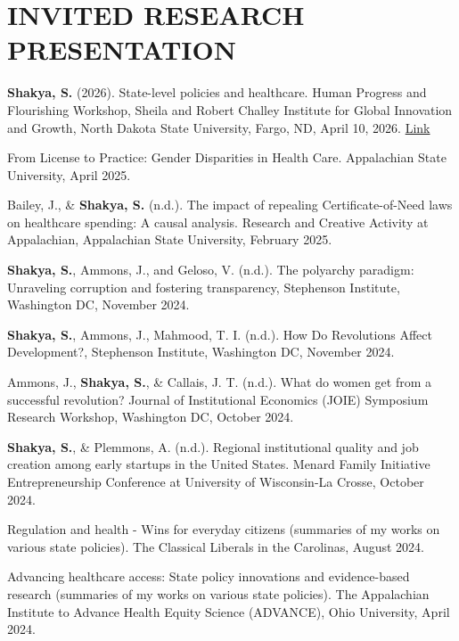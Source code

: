 \section*{INVITED RESEARCH PRESENTATION}
\begin{etaremune}
\item \textbf{Shakya, S.} (2026). State-level policies and healthcare. Human Progress and Flourishing Workshop, Sheila and Robert Challey Institute for Global Innovation and Growth, North Dakota State University, Fargo, ND, April 10, 2026. \hfill \href{https://www.ndsu.edu/challeyinstitute/events/workshop}{Link}

\item From License to Practice: Gender Disparities in Health Care. Appalachian State University, April 2025.

\item Bailey, J., \& \textbf{Shakya, S.} (n.d.). The impact of repealing Certificate-of-Need laws on healthcare spending: A causal analysis. Research and Creative Activity at Appalachian, Appalachian State University, February 2025.

\item \textbf{Shakya, S.}, Ammons, J., and Geloso, V. (n.d.). The polyarchy paradigm: Unraveling corruption and fostering transparency, Stephenson Institute, Washington DC, November 2024.

\item \textbf{Shakya, S.}, Ammons, J., Mahmood, T. I. (n.d.). How Do Revolutions Affect Development?, Stephenson Institute, Washington DC, November 2024.

\item Ammons, J., \textbf{Shakya, S.}, \& Callais, J. T. (n.d.). What do women get from a successful revolution? Journal of Institutional Economics (JOIE) Symposium Research Workshop, Washington DC, October 2024.

\item \textbf{Shakya, S.}, \& Plemmons, A. (n.d.). Regional institutional quality and job creation among early startups in the United States. Menard Family Initiative Entrepreneurship Conference at University of Wisconsin-La Crosse, October 2024.

\item Regulation and health - Wins for everyday citizens (summaries of my works on various state policies). The Classical Liberals in the Carolinas, August 2024.

\item Advancing healthcare access: State policy innovations and evidence-based research (summaries of my works on various state policies). The Appalachian Institute to Advance Health Equity Science (ADVANCE), Ohio University, April 2024.


\end{etaremune}
